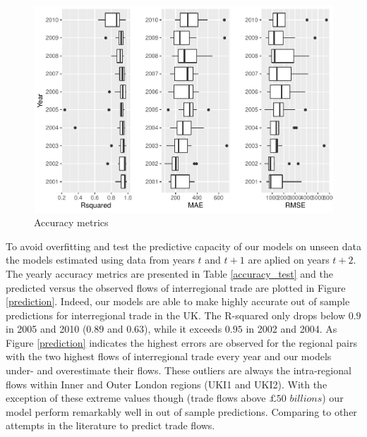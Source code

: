 \documentclass[sigconf]{acmart}
\begin{document}
\begin{figure}[p]
	\includegraphics[width=0.6\linewidth]{hl_files/figure-latex/unnamed-chunk-1-1} \caption{\label{accuracy_insample}Accuracy metrics}\label{fig:unnamed-chunk-1}
\end{figure}

To avoid overfitting and test the predictive capacity of our models on
unseen data the models estimated using data from years \(t\) and
\(t + 1\) are aplied on years \(t + 2\). The yearly accuracy metrics are
presented in Table \ref{accuracy_test} and the predicted versus the
observed flows of interregional trade are plotted in Figure
\ref{prediction}. Indeed, our models are able to make highly accurate
out of sample predictions for interregional trade in the UK. The
R-squared only drops below \(0.9\) in 2005 and 2010 (\(0.89\) and
\(0.63\)), while it exceeds \(0.95\) in 2002 and 2004. As Figure
\ref{prediction} indicates the highest errors are observed for the
regional pairs with the two highest flows of interregional trade every
year and our models under- and overestimate their flows. These outliers
are always the intra-regional flows within Inner and Outer London
regions (UKI1 and UKI2). With the exception of these extreme values
though (trade flows above \(\pounds 50\) \(billions\)) our model perform
remarkably well in out of sample predictions. Comparing to other
attempts in the literature to predict trade flows.
\end{document}
